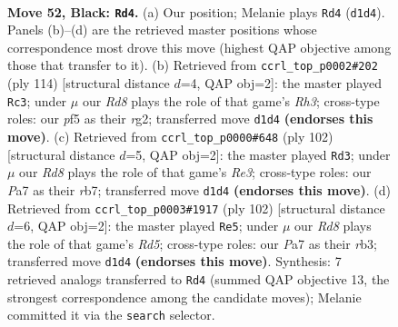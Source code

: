 \documentclass[11pt]{article}
\begin{document}
\clearpage

\begin{figure}[p]\centering
\begin{subfigure}{0.46\textwidth}\centering
\resizebox{\linewidth}{!}{%
\newchessgame
\chessboard[
  setfen={8/p2p2k1/2p5/5P2/8/5K2/8/3r4 b - - 6 52},
  showmover=false,
  pgfstyle=straightmove, color=movearrow, markmove={d1-d4}
]}
\caption{}
\end{subfigure}\hfill
\begin{subfigure}{0.46\textwidth}\centering
\resizebox{\linewidth}{!}{%
\newchessgame
\chessboard[
  setfen={8/8/1p6/8/1P3k2/P6R/6r1/2K5 w - - 16 58},
  showmover=false,
  pgfstyle=straightmove, color=movearrow, markmove={h3-c3}
]}
\caption{}
\end{subfigure}
\\[4pt]
\begin{subfigure}{0.46\textwidth}\centering
\resizebox{\linewidth}{!}{%
\newchessgame
\chessboard[
  setfen={8/1r6/5k2/7p/7P/4R1P1/8/7K w - - 1 52},
  showmover=false,
  pgfstyle=straightmove, color=movearrow, markmove={e3-d3}
]}
\caption{}
\end{subfigure}\hfill
\begin{subfigure}{0.46\textwidth}\centering
\resizebox{\linewidth}{!}{%
\newchessgame
\chessboard[
  setfen={7k/8/6pP/3R2P1/8/1r6/5K2/8 w - - 8 52},
  showmover=false,
  pgfstyle=straightmove, color=movearrow, markmove={d5-e5}
]}
\caption{}
\end{subfigure}
\caption{\textbf{Move 52, Black: \texttt{Rd4}.} (a) Our position; Melanie plays \texttt{Rd4} (\texttt{d1d4}). Panels (b)--(d) are the retrieved master positions whose correspondence most drove this move (highest QAP objective among those that transfer to it). (b) Retrieved from \texttt{ccrl\_top\_p0002\#202} (ply 114) [structural distance $d$=4, QAP obj=2]: the master played \texttt{Rc3}; under $\mu$ our \emph{Rd8} plays the role of that game's \emph{Rh3}; cross-type roles: our \emph{p}f5 as their \emph{r}g2; transferred move \texttt{d1d4} \textbf{(endorses this move)}. (c) Retrieved from \texttt{ccrl\_top\_p0000\#648} (ply 102) [structural distance $d$=5, QAP obj=2]: the master played \texttt{Rd3}; under $\mu$ our \emph{Rd8} plays the role of that game's \emph{Re3}; cross-type roles: our \emph{P}a7 as their \emph{r}b7; transferred move \texttt{d1d4} \textbf{(endorses this move)}. (d) Retrieved from \texttt{ccrl\_top\_p0003\#1917} (ply 102) [structural distance $d$=6, QAP obj=2]: the master played \texttt{Re5}; under $\mu$ our \emph{Rd8} plays the role of that game's \emph{Rd5}; cross-type roles: our \emph{P}a7 as their \emph{r}b3; transferred move \texttt{d1d4} \textbf{(endorses this move)}. Synthesis: 7 retrieved analogs transferred to \texttt{Rd4} (summed QAP objective 13, the strongest correspondence among the candidate moves); Melanie committed it via the \texttt{search} selector.}
\label{fig:thought-m103}
\end{figure}
\end{document}
